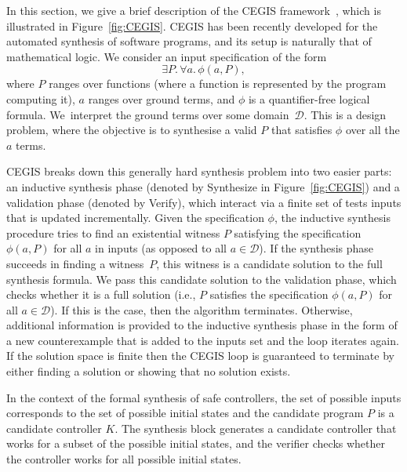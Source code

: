 In this section, we give a brief description of the CEGIS framework~\cite{jha-icse10,
  DBLP:conf/asplos/Solar-LezamaTBSS06}, which is illustrated in Figure~\ref{fig:CEGIS}. 
  CEGIS has been recently developed for the automated synthesis of software programs, 
  and its setup is naturally that of mathematical logic. We consider an input specification of the form 
$$
\exists P .\, \forall a.\, \phi(a, P),
$$  
where $P$ ranges over functions (where a function is represented by the program computing it),
$a$ ranges over ground terms, 
and $\phi$ is a quantifier-free logical formula. 
We~interpret the ground terms over some domain~$\mathcal{D}$. 
This is a design problem, where the objective is to synthesise a valid $P$ that satisfies $\phi$ over all the $a$ terms. 

CEGIS breaks down this generally hard synthesis problem into two easier parts:
an inductive synthesis phase (denoted by {\sc Synthesize} in
Figure~\ref{fig:CEGIS}) and a validation phase (denoted by {\sc
  Verify}), which interact via a finite set of tests {\sc
  inputs} that is updated incrementally.
Given the specification $\phi$, the inductive synthesis procedure tries to
find an existential witness $P$ satisfying the specification
$\phi(a, P)$ for all $a$ in {\sc inputs} (as opposed to all $a \in
\mathcal{D}$).
%
If the synthesis phase succeeds in finding a witness~$P$, this witness is a
candidate solution to the full synthesis formula.  We pass this candidate
solution to the validation phase, which checks whether it is a full solution
(i.e., $P$ satisfies the specification $\phi(a, P)$ for all
$a\in\mathcal{D}$).  If this is the case, then the algorithm terminates. 
Otherwise, additional information is provided to the inductive synthesis
phase in the form of a new counterexample that is added to the {\sc inputs}
set and the loop iterates again.  %
If the solution space is finite then the CEGIS loop is guaranteed to
terminate by either finding a solution or showing that no solution
exists.

In the context of the formal synthesis of safe controllers, 
the set of possible {\sc inputs} corresponds to the set of possible initial states and the 
candidate program $P$ is a candidate controller $K$. The synthesis block generates a candidate
controller that works for a subset of the possible initial states, and the verifier checks whether 
the controller works for all possible initial states. 

